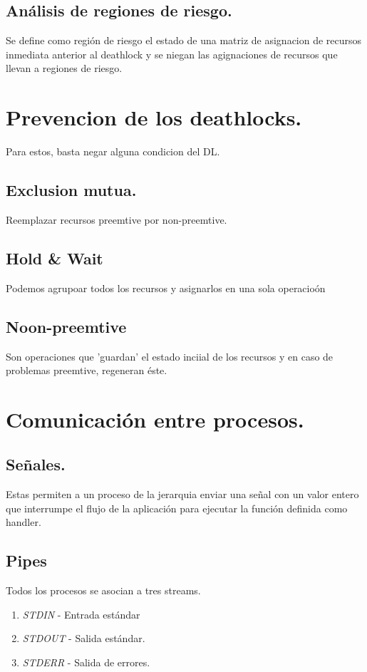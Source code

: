 \subsection{An\'{a}lisis de regiones de riesgo.}
Se define como regi\'{o}n de riesgo el estado de una matriz de asignacion de recursos inmediata anterior al deathlock y se niegan las agignaciones de recursos que llevan a regiones de riesgo.\\

\section{Prevencion de los deathlocks.}
Para estos, basta negar alguna condicion del DL.

\subsection{Exclusion mutua.} Reemplazar recursos preemtive por non-preemtive.\\
\subsection{Hold \& Wait} Podemos agrupoar todos los recursos y asignarlos en una sola operacio\'{o}n\\
\subsection{Noon-preemtive} Son operaciones que 'guardan' el estado inciial de los recursos y en caso de problemas preemtive, regeneran \'{e}ste.\\

\section{Comunicaci\'{o}n entre procesos.}

\subsection{Se\~{n}ales.} Estas permiten a un proceso de la jerarquia enviar una se\~{n}al con un valor entero que interrumpe el flujo de la aplicaci\'{o}n para ejecutar la funci\'{o}n definida como handler.\\

\subsection{Pipes} Todos los procesos se asocian a tres streams.
\begin{enumerate}
	\item \textit{STDIN} - Entrada est\'{a}ndar
	\item \textit{STDOUT} - Salida est\'{a}ndar.
	\item \textit{STDERR} - Salida  de errores.
\end{enumerate}
